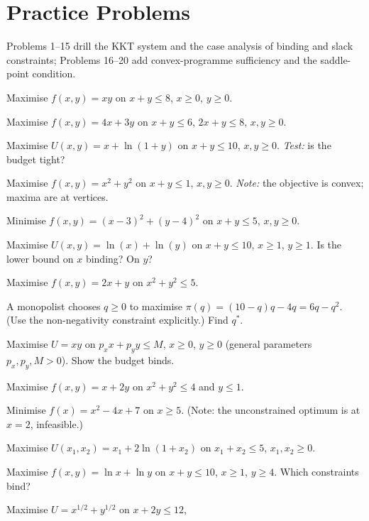\section{Practice Problems}

Problems 1--15 drill the KKT system and the case analysis of binding and
slack constraints; Problems 16--20 add convex-programme sufficiency and the
saddle-point condition.

\begin{problems}
  \item Maximise $f(x, y) = x y$ on $x + y \leq 8$, $x \geq 0$, $y \geq 0$.
  \item Maximise $f(x, y) = 4 x + 3 y$ on $x + y \leq 6$,
        $2 x + y \leq 8$, $x, y \geq 0$.
  \item Maximise $U(x, y) = x + \ln(1 + y)$ on $x + y \leq 10$,
        $x, y \geq 0$. \emph{Test:} is the budget tight?
  \item Maximise $f(x, y) = x^2 + y^2$ on $x + y \leq 1$, $x, y \geq 0$.
        \emph{Note:} the objective is convex; maxima are at vertices.
  \item Minimise $f(x, y) = (x - 3)^2 + (y - 4)^2$ on $x + y \leq 5$,
        $x, y \geq 0$.
  \item Maximise $U(x, y) = \ln(x) + \ln(y)$ on $x + y \leq 10$,
        $x \geq 1$, $y \geq 1$. Is the lower bound on $x$ binding? On $y$?
  \item Maximise $f(x, y) = 2 x + y$ on $x^2 + y^2 \leq 5$.
  \item A monopolist chooses $q \geq 0$ to maximise
        $\pi(q) = (10 - q) q - 4 q = 6 q - q^2$. (Use the non-negativity
        constraint explicitly.) Find $q^*$.
  \item Maximise $U = x y$ on $p_x x + p_y y \leq M$, $x \geq 0$,
        $y \geq 0$ (general parameters $p_x, p_y, M > 0$). Show the budget
        binds.
  \item Maximise $f(x, y) = x + 2 y$ on $x^2 + y^2 \leq 4$ and $y \leq 1$.
  \item Minimise $f(x) = x^2 - 4 x + 7$ on $x \geq 5$. (Note: the
        unconstrained optimum is at $x = 2$, infeasible.)
  \item Maximise $U(x_1, x_2) = x_1 + 2 \ln(1 + x_2)$ on
        $x_1 + x_2 \leq 5$, $x_1, x_2 \geq 0$.
  \item Maximise $f(x, y) = \ln x + \ln y$ on $x + y \leq 10$,
        $x \geq 1$, $y \geq 4$. Which constraints bind?
  \item Maximise $U = x^{1/2} + y^{1/2}$ on $x + 2 y \leq 12$,

\end{problems}
